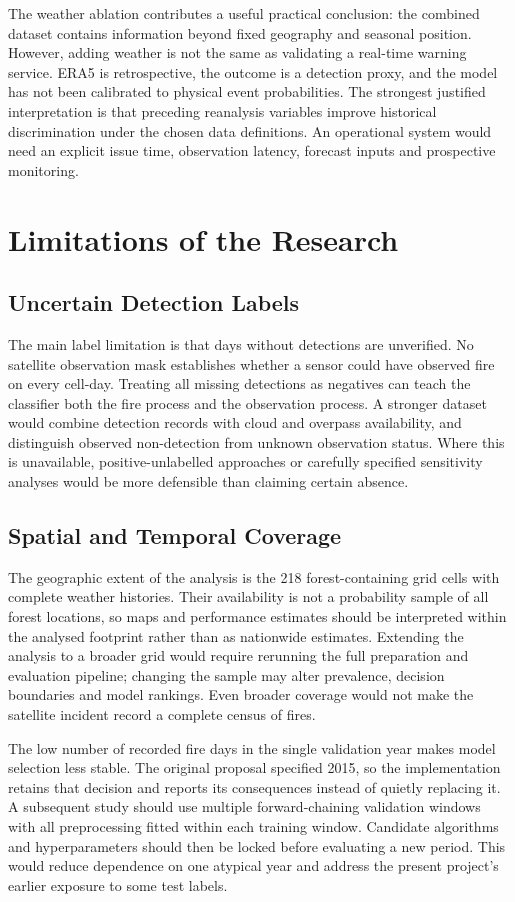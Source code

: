 \documentclass[conference,a4paper]{IEEEtran}
\begin{document}
The weather ablation contributes a useful practical conclusion: the combined dataset contains information beyond fixed geography and seasonal position. However, adding weather is not the same as validating a real-time warning service. ERA5 is retrospective, the outcome is a detection proxy, and the model has not been calibrated to physical event probabilities. The strongest justified interpretation is that preceding reanalysis variables improve historical discrimination under the chosen data definitions. An operational system would need an explicit issue time, observation latency, forecast inputs and prospective monitoring.

\section{Limitations of the Research}
\subsection{Uncertain Detection Labels}
The main label limitation is that days without detections are unverified. No satellite observation mask establishes whether a sensor could have observed fire on every cell-day. Treating all missing detections as negatives can teach the classifier both the fire process and the observation process. A stronger dataset would combine detection records with cloud and overpass availability, and distinguish observed non-detection from unknown observation status. Where this is unavailable, positive-unlabelled approaches or carefully specified sensitivity analyses would be more defensible than claiming certain absence.

\subsection{Spatial and Temporal Coverage}
The geographic extent of the analysis is the 218 forest-containing grid cells with complete weather histories. Their availability is not a probability sample of all forest locations, so maps and performance estimates should be interpreted within the analysed footprint rather than as nationwide estimates. Extending the analysis to a broader grid would require rerunning the full preparation and evaluation pipeline; changing the sample may alter prevalence, decision boundaries and model rankings. Even broader coverage would not make the satellite incident record a complete census of fires.

The low number of recorded fire days in the single validation year makes model selection less stable. The original proposal specified 2015, so the implementation retains that decision and reports its consequences instead of quietly replacing it. A subsequent study should use multiple forward-chaining validation windows with all preprocessing fitted within each training window. Candidate algorithms and hyperparameters should then be locked before evaluating a new period. This would reduce dependence on one atypical year and address the present project's earlier exposure to some test labels.
\end{document}
